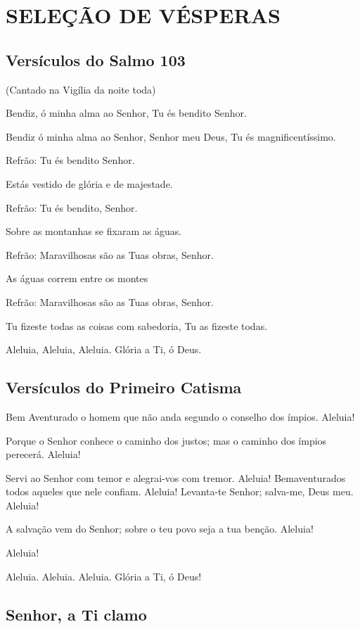 \documentclass{subfiles}
\begin{document}
\chapter{SELEÇÃO DE VÉSPERAS}

\section*{Versículos do Salmo 103}

(Cantado na Vigília da noite toda)

Bendiz, ó minha alma ao Senhor, Tu és bendito Senhor.

Bendiz ó minha alma ao Senhor, Senhor meu Deus, Tu és magnificentíssimo.

Refrão: Tu és bendito Senhor.

Estás vestido de glória e de majestade.

Refrão: Tu és bendito, Senhor.

Sobre as montanhas se fixaram as águas.

Refrão: Maravilhosas são as Tuas obras, Senhor.

As águas correm entre os montes

Refrão: Maravilhosas são as Tuas obras, Senhor.

Tu fizeste todas as coisas com sabedoria, Tu as fizeste todas.

\Doxology{}

Aleluia, Aleluia, Aleluia. Glória a Ti, ó Deus. \thrice{}

\section*{Versículos do Primeiro Catisma}

Bem Aventurado o homem que não anda segundo o conselho dos ímpios. Aleluia!

Porque o Senhor conhece o caminho dos justos; mas o caminho dos ímpios perecerá.
Aleluia!

Servi ao Senhor com temor e alegrai-vos com tremor. Aleluia! Bemaventurados
todos aqueles que nele confiam. Aleluia! Levanta-te Senhor; salva-me, Deus meu.
Aleluia!

A salvação vem do Senhor; sobre o teu povo seja a tua benção. Aleluia!

\Doxology{} Aleluia!

Aleluia. Aleluia. Aleluia. Glória a Ti, ó Deus! \thrice{}

\section*{Senhor, a Ti clamo}
\end{document}
